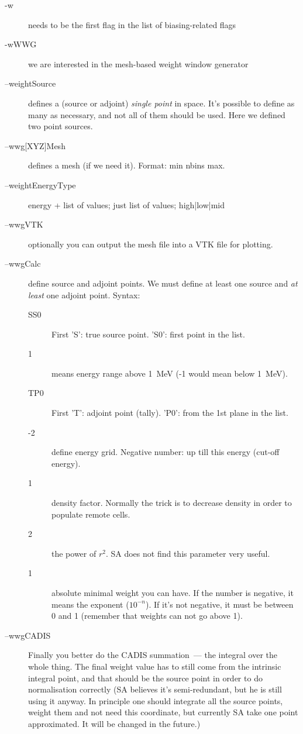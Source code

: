 \begin{description}
\item[-w] needs to be the first flag in the list of biasing-related flags
\item[-wWWG] we are interested in the mesh-based weight window generator
\item[--weightSource] defines a (source or adjoint) {\em single point} in space. It's possible to define as many as necessary, and not all of them should be used.
  Here we defined two point sources.
\item[--wwg{[XYZ]}Mesh] defines a mesh (if we need it). Format: min nbins max.
\item[--weightEnergyType] energy + list of values; just list of values; high|low|mid \
\item[--wwgVTK] optionally you can output the mesh file into a VTK file for plotting.
\item[--wwgCalc] define source and adjoint points. We must define at least one source and {\em at least} one adjoint point.
  Syntax:
  \begin{description}
  \item[SS0] First 'S': true source point. 'S0': first point in the list.
  \item[1] means energy range above \SI{1}{\mega\electronvolt} (-1 would mean below \SI{1}{\mega\electronvolt}).
  \item[TP0] First 'T': adjoint point (tally). 'P0': from the 1st plane in the list.
  \item[-2] define energy grid. Negative number: up till this energy (cut-off energy).
  \item[1] density factor. Normally the trick is to decrease density in order to populate remote cells.
  \item[2] the power of $r^2$. SA does not find this parameter very useful.
  \item[1] absolute minimal weight you can have. If the number is negative, it means the exponent ($10^{-n}$). If it's not negative, it must be between 0 and 1 (remember that weights can not go above 1).
  \end{description}
\item[--wwgCADIS] Finally you better do the CADIS summation~--- the integral over the whole thing. The final weight value has to still
  come from the intrinsic integral point, and that should be the source point in order to do normalisation correctly (SA believes it's semi-redundant, but he is still using it anyway. In principle one should integrate all the source points, weight them and not need this coordinate, but currently SA take one point approximated. It will be changed in the future.)
\end{description}

